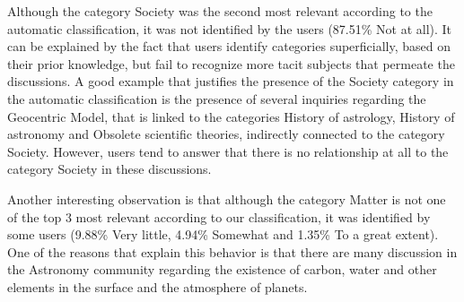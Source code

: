 Although the category Society was the second most relevant according to the automatic classification, it was not identified by the users (87.51\% Not at all). It can be explained by the fact that users identify categories superficially, based on their prior knowledge, but fail to recognize more tacit subjects that permeate the discussions. A good example that justifies the presence of the Society category in the automatic classification is the presence of several inquiries regarding the Geocentric Model, that is linked to the categories History of astrology, History of astronomy and Obsolete scientific theories, indirectly connected to the category Society.
However, users tend to answer that there is no relationship at all to the category Society in these discussions.

Another interesting observation is that although the category Matter is not one of the top 3 most relevant according to our classification, it was identified by some users (9.88\% Very little, 4.94\% Somewhat and 1.35\% To a great extent). One of the reasons that explain this behavior is that there are many discussion in the Astronomy community regarding the existence of carbon, water and other elements in the surface and the atmosphere of planets. 




